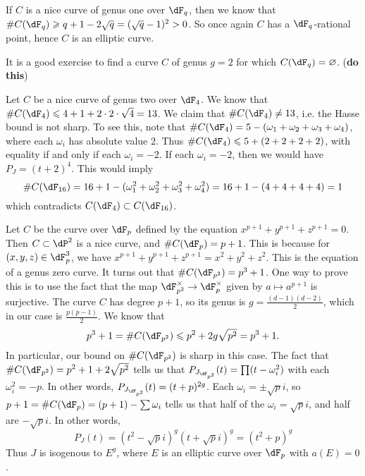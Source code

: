 \documentclass{article}
\begin{document}
\begin{example}
If $C$ is a nice curve of genus one over $\dF_q$, then we know that 
$\# C(\dF_q) \geqslant q+1-2\sqrt q = (\sqrt q-1)^2 > 0$. So once again $C$ has 
a $\dF_q$-rational point, hence $C$ is an elliptic curve. 
\end{example}

It is a good exercise to find a curve $C$ of genus $g=2$ for which 
$C(\dF_q)=\varnothing$. (\textbf{do this})

\begin{example}
Let $C$ be a nice curve of genus two over $\dF_4$. We know that 
$\# C(\dF_4) \leqslant 4+1+2\cdot 2\cdot \sqrt 4 = 13$. We claim that 
$\# C(\dF_4) \ne 13$, i.e. the Hasse bound is not sharp. To see this, note 
that $\# C(\dF_4) = 5 - (\omega_1+\omega_2+\omega_3+\omega_4)$, where each 
$\omega_i$ has absolute value $2$. Thus 
$\# C(\dF_4) \leqslant 5 + (2+2+2+2)$, with equality if and only if each 
$\omega_i=-2$. If each $\omega_i=-2$, then we would have 
$P_J=(t+2)^4$. This would imply 
\[
  \# C(\dF_{16}) = 16+1-(\omega_1^2+\omega_2^2+\omega_3^2+\omega_4^2) = 16+1-(4+4+4+4)=1
\]
which contradicts $C(\dF_4)\subset C(\dF_{16})$. 
\end{example}

\begin{example}
Let $C$ be the curve over $\dF_p$ defined by the equation 
$x^{p+1}+y^{p+1}+z^{p+1}=0$. Then $C\subset \dP^2$ is a nice curve, and 
$\# C(\dF_p)=p+1$. This is because for $(x,y,z)\in \dF_p^3$, we have 
$x^{p+1}+y^{p+1}+z^{p+1}=x^2+y^2+z^2$. This is the equation of a genus zero 
curve. It turns out that $\# C(\dF_{p^2}) = p^3+1$. One way to prove this is 
to use the fact that the map $\dF_{p^2}^\times \to \dF_p^\times$ given by 
$a\mapsto a^{p+1}$ is surjective. The curve $C$ has degree 
$p+1$, so its genus is $g=\frac{(d-1)(d-2)}{2}$, which in our case is 
$\frac{p(p-1)}{2}$. We know that 
\[
  p^3+1 = \# C(\dF_{p^2}) \leqslant p^2+2 g\sqrt{p^2} = p^3+1 \text{.}
\]
In particular, our bound on $\# C(\dF_{p^2})$ is sharp in this case. The fact 
that $\# C(\dF_{p^2}) = p^2+1+2\sqrt{p^2}$ tells us that 
$P_{J_{\dF_{p^2}}}(t) = \prod (t-\omega_i^2)$ with each $\omega_i^2=-p$. In 
other words, $P_{J_{\dF_{p^2}}}(t) = (t+p)^{2g}$. Each 
$\omega_i = \pm \sqrt p i$, so $p+1=\# C(\dF_p) = (p+1) - \sum \omega_i$ 
tells us that half of the $\omega_i=\sqrt p i$, and half are 
$-\sqrt p i$. In other words, 
\[
  P_J(t) = (t^2-\sqrt p i)^g (t+\sqrt p i)^g = (t^2+p)^g
\]
Thus $J$ is isogenous to $E^g$, where $E$ is an elliptic curve over $\dF_p$ 
with $a(E)=0$. 
\end{example}
\end{document}
